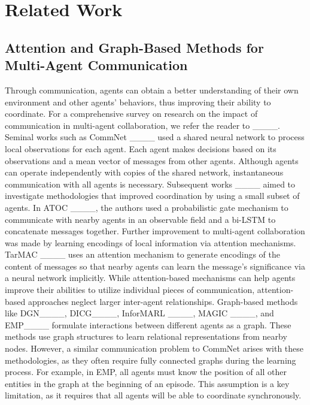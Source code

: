 \section{Related Work}
\subsection{Attention and Graph-Based Methods for Multi-Agent Communication} 
Through communication, agents can obtain a better understanding of their own environment and other agents' behaviors, thus improving their ability to coordinate. For a comprehensive survey on research on the impact of communication in multi-agent collaboration, we refer the reader to ____. Seminal works such as CommNet ____ used a shared neural network to process local observations for each agent. Each agent makes decisions based on its observations and a mean vector of messages from other agents. Although agents can operate independently with copies of the shared network, instantaneous communication with all agents is necessary. Subsequent works ____ aimed to investigate methodologies that improved coordination by using a small subset of agents. In ATOC ____, the authors used a probabilistic gate mechanism to communicate with nearby agents in an observable field and a bi-LSTM to concatenate messages together. Further improvement to multi-agent collaboration was made by learning encodings of local information via attention mechanisms. TarMAC ____ uses an attention mechanism to generate encodings of the content of messages so that nearby agents can learn the message's significance via a neural network implicitly. While attention-based mechanisms can help agents improve their abilities to utilize individual pieces of communication, attention-based approaches neglect larger inter-agent relationships. Graph-based methods like DGN____, DICG____, InforMARL ____, MAGIC ____, and EMP____ formulate interactions between different agents as a graph. These methods use graph structures to learn relational representations from nearby nodes. However, a similar communication problem to CommNet arises with these methodologies, as they often require fully connected graphs during the learning process.  For example, in EMP, all agents must know the position of all other entities in the graph at the beginning of an episode. This assumption is a key limitation, as it requires that all agents will be able to coordinate synchronously.


